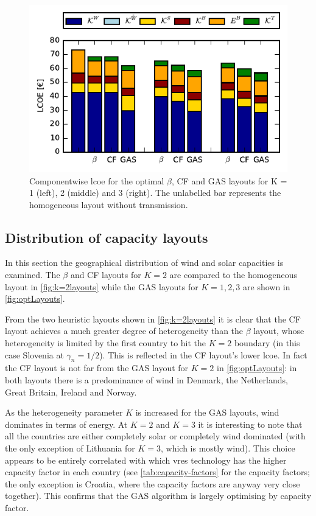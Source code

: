 \documentclass[a4paper, 5p, sort&compress]{elsarticle}%
\begin{document}
\begin{figure}[h!]
  \centering
  \includegraphics[width = \columnwidth]{costVE50}
  \caption{Componentwise \gls{lcoe} for the optimal $\beta$, CF and GAS layouts
    for K = 1 (left), 2 (middle) and 3 (right). The unlabelled bar
    represents the homogeneous layout without transmission.}
  \label{fig:cost}
\end{figure}



\subsection{Distribution of capacity layouts}

In this section the geographical distribution of wind and solar capacities is examined.
The $\beta$
and CF layouts for $K=2$
are compared to the homogeneous layout in \cref{fig:k=2layouts} while the GAS layouts for $K=1,2,3$ are shown
in \cref{fig:optLayouts}. %

From the two heuristic layouts shown in \cref{fig:k=2layouts} it is
clear that the CF layout achieves a much greater degree of
heterogeneity than the $\beta$ layout, whose heterogeneity is limited
by the first country to hit the $K=2$ boundary (in this case Slovenia
at $\gamma_n = 1/2$). This is reflected in the CF layout's
lower \gls{lcoe}.  In fact the CF layout is not far from the GAS
layout for $K=2$ in \cref{fig:optLayouts}: in both layouts there
is a predominance of wind in Denmark, the Netherlands, Great Britain,
Ireland and Norway.

As the heterogeneity parameter $K$ is increased for the GAS layouts,
wind dominates in terms of energy. At $K=2$ and $K=3$ it is
interesting to note that all the countries are either completely solar
or completely wind dominated (with the only exception of Lithuania for
$K=3$, which is mostly wind). This choice appears to be entirely correlated with which
\gls{vres} technology has the higher capacity factor in each country (see
\cref{tab:capacity-factors} for the capacity factors; the only
exception is Croatia, where the capacity factors are anyway very close
together). This confirms that the GAS algorithm is largely optimising
by capacity factor.
\end{document}
